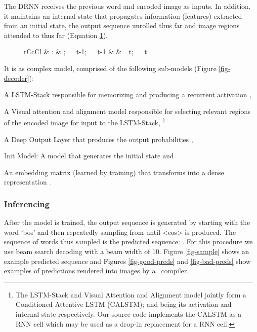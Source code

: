 \documentclass{article}
\begin{document}
The DRNN receives the previous word  and encoded image  as inputs. In addition, it maintains an internal state  that propagates information (features) extracted from an initial state, the output sequence unrolled thus far and image regions attended to thus far (Equation \ref{eqn-rnn}).
\begin{figure}
	\begin{IEEEeqnarray}{rCcCl}
		 & : & \lbrace {}; \,  _{t-1}; \, _{t-1} \rbrace & \rightarrow & \lbrace  {}_t; \, _{t} \rbrace \label{eqn-rnn}
	\end{IEEEeqnarray}
\end{figure}
It is as complex model, comprised of the following sub-models (Figure \ref{fig-decoder}):
\begin{enumerate*}[label=\arabic*)]
	\item A {LSTM-Stack} \cite{Hochreiter:1997:LSM:1246443.1246450} responsible for memorizing  and producing a recurrent activation ,
	\item A Visual {attention} and alignment model responsible for selecting relevant regions of the encoded image for input to the LSTM-Stack, \footnote{The LSTM-Stack and Visual Attention and Alignment model jointly form a Conditioned Attentive LSTM (CALSTM);  and  being its activation and internal state respectively. Our source-code implements the CALSTM as a RNN cell which may be used as a drop-in replacement for a RNN cell.}
	\item A {Deep Output} Layer \cite{Pascanu2013HowTC} that produces the output probabilities ,
	\item {Init Model}: A model that generates the initial state  and
	\item An {embedding} matrix  (learned by training) that transforms  into a dense representation .
\end{enumerate*}


\subsubsection{Inferencing}
After the model is trained, the output sequence is generated by starting with the word `bos' and then repeatedly sampling from  until <eos> is produced. The sequence of words thus sampled is the predicted sequence: .  For this procedure we use beam search decoding \cite{Graves2008SupervisedSL} with a beam width of 10. Figure \ref{fig-sample} shows an example predicted sequence and Figures \ref{fig-good-preds} and \ref{fig-bad-preds} show examples of predictions rendered into images by a \LaTeXe ~compiler.
\end{document}
